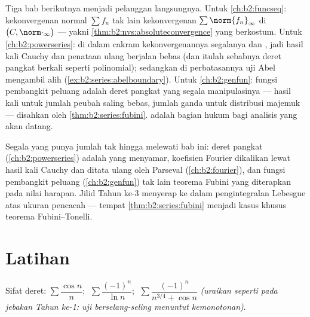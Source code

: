 \begin{remark}\label{rem:b2:series:perspectives}
Tiga bab berikutnya menjadi pelanggan langsungnya. Untuk
\cref{ch:b2:funcseq}: kekonvergenan normal $\sum f_n$ tak lain
kekonvergenan  $\sum\norm{f_n}_\infty$ di 
$\bigl(C, \norm\cdot_\infty\bigr)$ --- yakni
\cref{thm:b2:nvs:absoluteconvergence} yang berkostum. Untuk
\cref{ch:b2:powerseries}: di dalam cakram kekonvergenannya
segalanya  dan , jadi hasil kali Cauchy dan penataan
ulang berjalan bebas (dan itulah sebabnya deret pangkat berkali seperti
polinomial); sedangkan di perbatasannya uji Abel mengambil alih
(\cref{ex:b2:series:abelboundary}). Untuk \cref{ch:b2:genfun}:
fungsi pembangkit peluang adalah deret pangkat yang segala
manipulasinya --- hasil kali untuk jumlah peubah saling bebas, jumlah
ganda untuk distribusi majemuk --- disahkan oleh
\cref{thm:b2:series:fubini}.  adalah bagian
hukum bagi analisis yang akan datang.
\end{remark}

\begin{remark}
Segala yang punya jumlah tak hingga melewati bab ini: deret pangkat
(\cref{ch:b2:powerseries}) adalah  yang menyamar,
koefisien Fourier dikalikan lewat hasil kali Cauchy dan ditata
ulang oleh Parseval (\cref{ch:b2:fourier}), dan fungsi pembangkit
peluang (\cref{ch:b2:genfun}) tak lain teorema Fubini yang
diterapkan pada nilai harapan. Jilid Tahun ke-3 menyerap  ke dalam pengintegralan Lebesgue atas ukuran pencacah ---
tempat \cref{thm:b2:series:fubini} menjadi kasus khusus
teorema Fubini--Tonelli.
\end{remark}

\section{Latihan}

\begin{exercise}[$\star$]\label{exo:b2:series:1}
Sifat deret: $\sum \dfrac{\cos n}{n}$; $\;\sum \dfrac{(-1)^n}{\ln
n}$; $\;\sum \dfrac{(-1)^n}{n^{3/4} + \cos n}$ \emph{(uraikan seperti
pada jebakan Tahun ke-1: uji berselang-seling menuntut kemonotonan)}.
\end{exercise}

